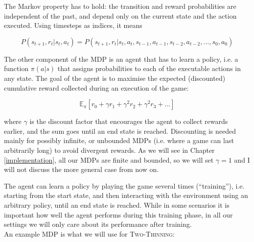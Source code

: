 The Markov property has to hold: the transition and reward probabilities are independent of the past, and depend only on the current state and the action executed. Using timesteps as indices, it means

\begin{equation} \label{eq:MarkovProperty}
    P(s_{t+1},r_{t} | s_{t}, a_{t}) = P(s_{t+1},r_{t} | s_{t}, a_{t}, s_{t-1}, a_{t-1}, s_{t-2}, a_{t-2}, ..., s_{0}, a_{0})
\end{equation}


The other component of the MDP is an agent that has to learn a policy, i.e. a function $\pi(a|s)$ that assigns probabilities to each of the executable actions in any state. The goal of the agent is to maximise the expected (discounted) cumulative reward collected during an execution of the game:

\begin{equation}\label{eq:cumReward}
\mathbb{E}_{\pi}[r_{0} + \gamma r_{1} + \gamma^2 r_{2} + \gamma^2 r_{3} + ...]
\end{equation}

where $\gamma$ is the discount factor that encourages the agent to collect rewards earlier, and the sum goes until an end state is reached. Discounting is needed mainly for possibly infinite, or unbounded MDPs (i.e. where a game can last arbitrarily long) to avoid divergent rewards. As we will see in Chapter \ref{implementation}, all our MDPs are finite and bounded, so we will set $\gamma=1$ and I will not discuss the more general case from now on.


The agent can learn a policy by playing the game several times (``training''), i.e. starting from the start state, and then interacting with the environment using an arbitrary policy, until an end state is reached. While in some scenarios it is important how well the agent performs during this training phase, in all our settings we will only care about its performance after training.\\

An example MDP is what we will use for \textsc{Two-Thinning}:

